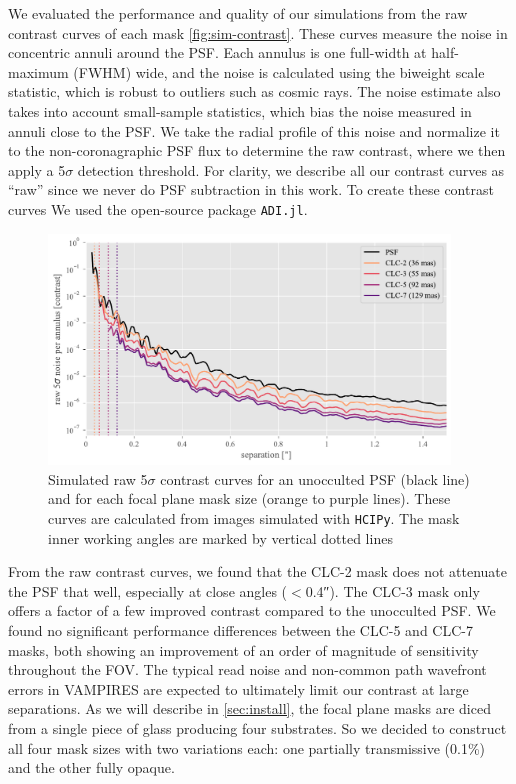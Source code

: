 \documentclass[]{spie}  %
\begin{document}
We evaluated the performance and quality of our simulations from the raw contrast curves of each mask \autoref{fig:sim-contrast}. These curves measure the noise in concentric annuli around the PSF. Each annulus is one full-width at half-maximum (FWHM) wide, and the noise is calculated using the biweight scale statistic, which is robust to outliers such as cosmic rays. The noise estimate also takes into account small-sample statistics\cite{mawet2014}, which bias the noise measured in annuli close to the PSF. We take the radial profile of this noise and normalize it to the non-coronagraphic PSF flux to determine the raw contrast, where we then apply a 5$\sigma$ detection threshold. For clarity, we describe all our contrast curves as ``raw'' since we never do PSF subtraction in this work. To create these contrast curves We used the open-source package \texttt{ADI.jl}\cite{lucas2020}.

\begin{figure}
   \centering
   \includegraphics[width=0.95\textwidth]{figures/simulated_curves}
   \caption{Simulated raw 5$\sigma$ contrast curves for an unocculted PSF (black line) and for each focal plane mask size (orange to purple lines). These curves are calculated from images simulated with \texttt{HCIPy}. The mask inner working angles are marked by vertical dotted lines}\label{fig:sim-contrast}
\end{figure}

From the raw contrast curves, we found that the CLC-2 mask does not attenuate the PSF that well, especially at close angles ($<$\ang{;;0.4}). The CLC-3 mask only offers a factor of a few improved contrast compared to the unocculted PSF. We found no significant performance differences between the CLC-5 and CLC-7 masks, both showing an improvement of an order of magnitude of sensitivity throughout the FOV. The typical read noise and non-common path wavefront errors in VAMPIRES are expected to ultimately limit our contrast at large separations. As we will describe in \autoref{sec:install}, the focal plane masks are diced from a single piece of glass producing four substrates. So we decided to construct all four mask sizes with two variations each: one partially transmissive (0.1\%) and the other fully opaque.
\end{document}
